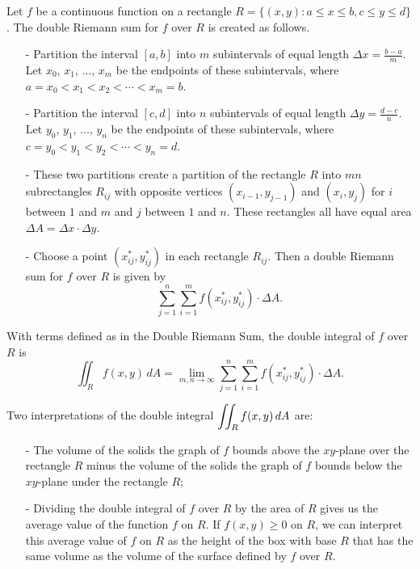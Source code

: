 \begin{summary}
\item Let $f$ be a continuous function on a rectangle $R = \{(x,y) : a \leq x \leq b, c \leq y \leq d\}$. The double Riemann sum for $f$ over $R$ is created as follows.
    \begin{itemize}
    \item[-] Partition the interval $[a, b]$ into $m$ subintervals of equal length $\Delta x = \frac{b-a}{m}$. Let $x_0$, $x_1$, $\ldots$, $x_m$ be the endpoints of these subintervals, where $a = x_0<x_1<x_2 < \cdots < x_m = b$.
    \item[-] Partition the interval $[c, d]$ into $n$ subintervals of equal length $\Delta y = \frac{d-c}{n}$. Let $y_0$, $y_1$, $\ldots$, $y_n$ be the endpoints of these subintervals, where $c = y_0<y_1<y_2 < \cdots < y_n = d$.
    \item[-] These two partitions create a partition of the rectangle $R$ into $mn$ subrectangles $R_{ij}$ with opposite vertices $(x_{i-1},y_{j-1})$ and $(x_i, y_j)$ for $i$ between $1$ and $m$ and $j$ between $1$ and $n$. These rectangles all have equal area $\Delta A = \Delta x \cdot \Delta y$.
    \item[-] Choose a point $(x_{ij}^*, y_{ij}^*)$ in each rectangle $R_{ij}$. Then a double Riemann sum for $f$ over $R$ is given by
    \[\sum_{j=1}^n \sum_{i=1}^m f(x_{ij}^*, y_{ij}^*) \cdot \Delta A.\]
    \end{itemize}
\item With terms defined as in the Double Riemann Sum, the double integral of $f$ over $R$ is
\[\iint_R f(x,y) \, dA = \lim_{m,n \to \infty} \sum_{j=1}^n \sum_{i=1}^m f(x_{ij}^*, y_{ij}^*) \cdot \Delta A.\]
\item Two interpretations of the double integral $\displaystyle \iint_R f(x,y) \, dA$ are:
    \begin{itemize}
    \item[-] The volume of the solids the graph of $f$ bounds above the $xy$-plane over the rectangle $R$ minus the volume of the solids the graph of $f$ bounds below the $xy$-plane under the rectangle $R$;
    \item[-] Dividing the double integral of $f$ over $R$ by the area of $R$ gives us the average value of the function $f$ on $R$. If $f(x, y) \geq  0$ on $R$, we can interpret this average value of $f$ on $R$ as the height of the box with base $R$ that has the same volume as the volume of the surface defined by $f$ over $R$.
    \end{itemize}
\end{summary}


\nin \hrulefill



\clearpage
